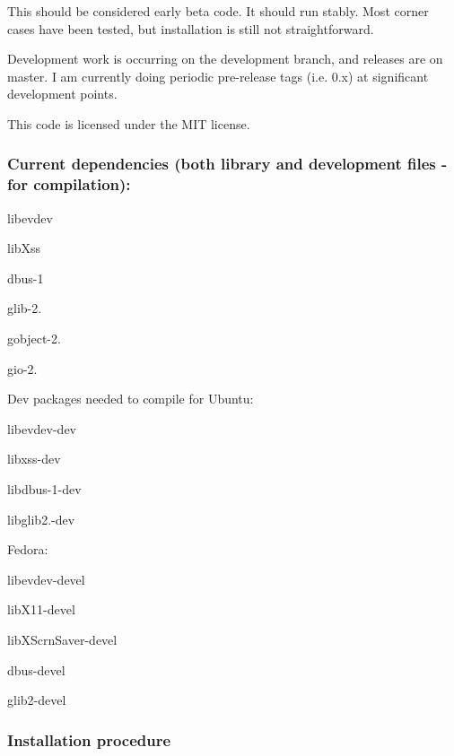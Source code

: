 This should be considered early beta code. It should run stably. Most corner cases have been tested, but installation is still not straightforward.

Development work is occurring on the development branch, and releases are on master. I am currently doing periodic pre-\/release tags (i.\+e. 0.\+x) at significant development points.

This code is licensed under the M\+IT license.

\subsubsection*{Current dependencies (both library and development files -\/ for compilation)\+:}


\begin{DoxyItemize}
\item libevdev
\item lib\+Xss
\item dbus-\/1
\item glib-\/2.
\item gobject-\/2.
\item gio-\/2.
\end{DoxyItemize}

Dev packages needed to compile for Ubuntu\+:
\begin{DoxyItemize}
\item libevdev-\/dev
\item libxss-\/dev
\item libdbus-\/1-\/dev
\item libglib2.-\/dev
\end{DoxyItemize}

Fedora\+:
\begin{DoxyItemize}
\item libevdev-\/devel
\item lib\+X11-\/devel
\item lib\+X\+Scrn\+Saver-\/devel
\item dbus-\/devel
\item glib2-\/devel
\end{DoxyItemize}

\subsubsection*{Installation procedure}


